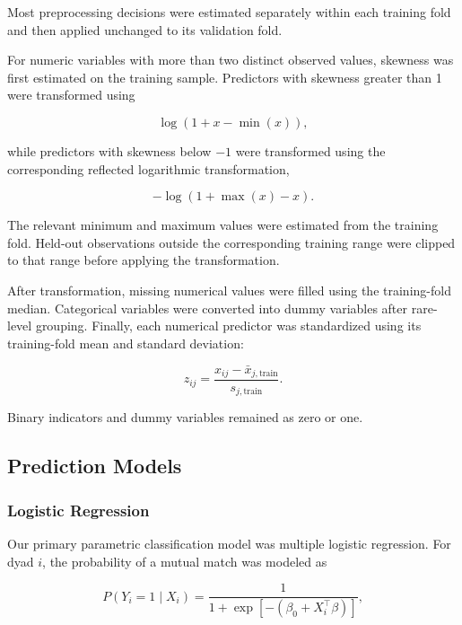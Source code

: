 \documentclass[11pt,letterpaper,reqno]{amsart}
\numberwithin{equation}{subsection}
\theoremstyle{definition}
\numberwithin{thm}{subsection}
\begin{document}
Most preprocessing decisions were estimated separately within each training fold and then applied unchanged to its validation fold.

For numeric variables with more than two distinct observed values, skewness was first estimated on the training sample. Predictors with skewness greater than 1 were transformed using

\begin{equation}
\log(1+x-\min(x)),
\end{equation}

while predictors with skewness below $-1$ were transformed using the corresponding reflected logarithmic transformation,

\begin{equation}
-\log(1+\max(x)-x).
\end{equation}

The relevant minimum and maximum values were estimated from the training fold. Held-out observations outside the corresponding training range were clipped to that range before applying the transformation.

After transformation, missing numerical values were filled using the training-fold median. Categorical variables were converted into dummy variables after rare-level grouping. Finally, each numerical predictor was standardized using its training-fold mean and standard deviation:

\begin{equation}
z_{ij}
=
\frac{
x_{ij}-\bar{x}_{j,\mathrm{train}}
}{
s_{j,\mathrm{train}}
}.
\end{equation}

Binary indicators and dummy variables remained as zero or one.


\subsection{Prediction Models}

\subsubsection{Logistic Regression}

Our primary parametric classification model was multiple logistic regression. For dyad $i$, the probability of a mutual match was modeled as

\begin{equation}
P(Y_i=1\mid X_i)
=
\frac{1}
{1+\exp\left[-(\beta_0 + X_i^\top\beta)\right]},
\end{equation}
\end{document}
